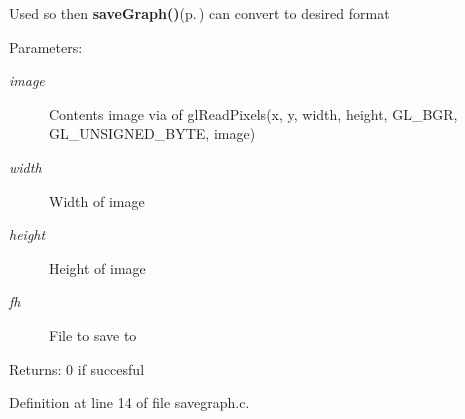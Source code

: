 Used so then {\bf save\-Graph()}{\rm (p.\,\pageref{savegraph_8h_a2})} can convert to desired format \begin{Desc}
\item[Parameters:]
\begin{description}
\item[{\em image}]Contents image via of gl\-Read\-Pixels(x, y, width, height, GL\_\-BGR, GL\_\-UNSIGNED\_\-BYTE, image) \item[{\em width}]Width of image \item[{\em height}]Height of image \item[{\em fh}]File to save to \end{description}
\end{Desc}
\begin{Desc}
\item[Returns:]0 if succesful \end{Desc}


Definition at line 14 of file savegraph.c.